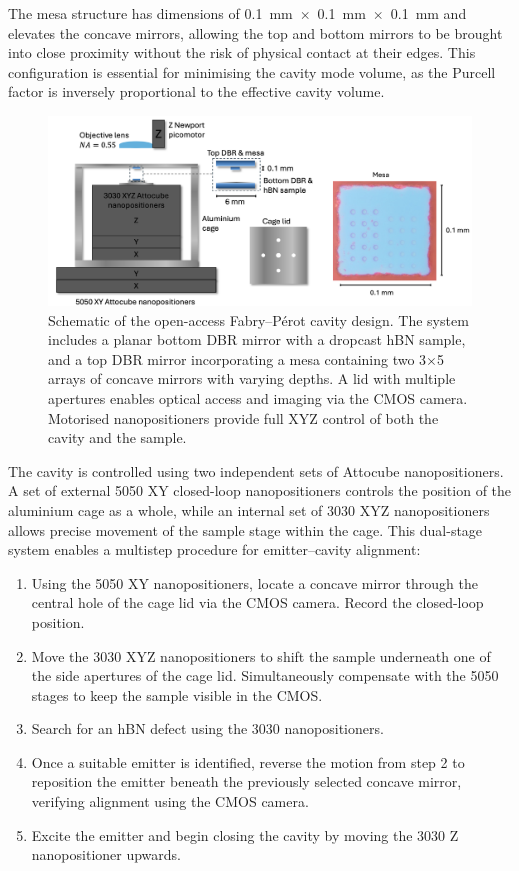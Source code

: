 The mesa structure has dimensions of 0.1~mm~$\times$~0.1~mm~$\times$~0.1~mm and elevates the concave mirrors, allowing the top and bottom mirrors to be brought into close proximity without the risk of physical contact at their edges. This configuration is essential for minimising the cavity mode volume, as the Purcell factor is inversely proportional to the effective cavity volume.

\begin{figure}[h]
    \centering
    \includegraphics[width=0.9\linewidth]{Figures/CavityDesign1.png}
    \caption{Schematic of the open-access Fabry–Pérot cavity design. The system includes a planar bottom DBR mirror with a dropcast hBN sample, and a top DBR mirror incorporating a mesa containing two 3$\times$5 arrays of concave mirrors with varying depths. A lid with multiple apertures enables optical access and imaging via the CMOS camera. Motorised nanopositioners provide full XYZ control of both the cavity and the sample.}
    \label{fig:cavity-design1}
\end{figure}

The cavity is controlled using two independent sets of Attocube nanopositioners. A set of external 5050 XY closed-loop nanopositioners controls the position of the aluminium cage as a whole, while an internal set of 3030 XYZ nanopositioners allows precise movement of the sample stage within the cage. This dual-stage system enables a multistep procedure for emitter–cavity alignment:

\begin{enumerate}
    \item Using the 5050 XY nanopositioners, locate a concave mirror through the central hole of the cage lid via the CMOS camera. Record the closed-loop position.
    \item Move the 3030 XYZ nanopositioners to shift the sample underneath one of the side apertures of the cage lid. Simultaneously compensate with the 5050 stages to keep the sample visible in the CMOS.
    \item Search for an hBN defect using the 3030 nanopositioners.
    \item Once a suitable emitter is identified, reverse the motion from step 2 to reposition the emitter beneath the previously selected concave mirror, verifying alignment using the CMOS camera.
    \item Excite the emitter and begin closing the cavity by moving the 3030 Z nanopositioner upwards.
\end{enumerate}

